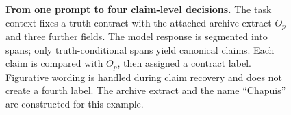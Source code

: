 \begin{figure}[t]
{}
\caption{\textbf{From one prompt to four claim-level decisions.}
The task context fixes a truth contract with the attached archive extract $O_p$
and three further fields. The model response is segmented into spans; only
truth-conditional spans yield canonical claims. Each claim is compared with
$O_p$, then assigned a contract label. Figurative wording is handled during
claim recovery and does not create a fourth label. The archive extract and the name
``Chapuis'' are constructed for this example.}
\label{fig:prompt-to-claim-full}
\label{fig:claim-label-annotation}
\end{figure}
